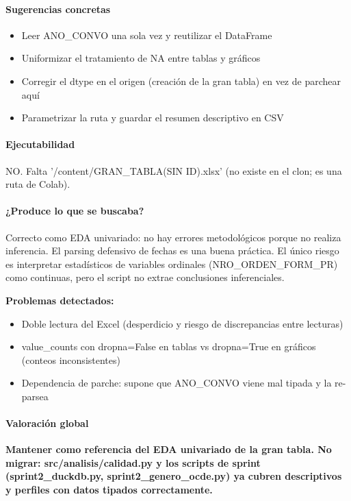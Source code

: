 \paragraph{Sugerencias concretas}
\begin{itemize}
  \item Leer ANO\_CONVO una sola vez y reutilizar el DataFrame
  \item Uniformizar el tratamiento de NA entre tablas y gráficos
  \item Corregir el dtype en el origen (creación de la gran tabla) en vez de parchear aquí
  \item Parametrizar la ruta y guardar el resumen descriptivo en CSV
\end{itemize}

\paragraph{Ejecutabilidad}
NO. Falta '/content/GRAN\_TABLA(SIN ID).xlsx' (no existe en el clon; es una ruta de Colab).

\paragraph{¿Produce lo que se buscaba?}
Correcto como EDA univariado: no hay errores metodológicos porque no realiza inferencia. El parsing defensivo de fechas es una buena práctica. El único riesgo es interpretar estadísticos de variables ordinales (NRO\_ORDEN\_FORM\_PR) como continuas, pero el script no extrae conclusiones inferenciales.

\begin{tcolorbox}[riesgo]
\textbf{Problemas detectados:}
\begin{itemize}
  \item Doble lectura del Excel (desperdicio y riesgo de discrepancias entre lecturas)
  \item value\_counts con dropna=False en tablas vs dropna=True en gráficos (conteos inconsistentes)
  \item Dependencia de parche: supone que ANO\_CONVO viene mal tipada y la re-parsea
\end{itemize}
\end{tcolorbox}

\paragraph{Valoración global}
\textbf{Mantener como referencia del EDA univariado de la gran tabla. No migrar: src/analisis/calidad.py y los scripts de sprint (sprint2\_duckdb.py, sprint2\_genero\_ocde.py) ya cubren descriptivos y perfiles con datos tipados correctamente.}

